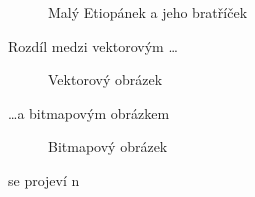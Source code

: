 \documentclass[a4paper, 11pt]{article}
\begin{document}
    \begin{figure}[!h]
        \centering
        \caption{Malý Etiopánek a jeho bratříček}
        \label{fig:obrazok1}
    \end{figure}
    
    
    \newpage
    Rozdíl medzi vektorovým \dots
    \begin{figure}[!h]
        \centering
        \caption{Vektorový obrázek}
        \label{fig:obrazok2}
    \end{figure}
    
    \dots a bitmapovým obrázkem
    \begin{figure}[!h]
        \centering
        \caption{Bitmapový obrázek}
        \label{fig:obrazok3}
    \end{figure}
    
    \noindent se projeví n
\end{document}
